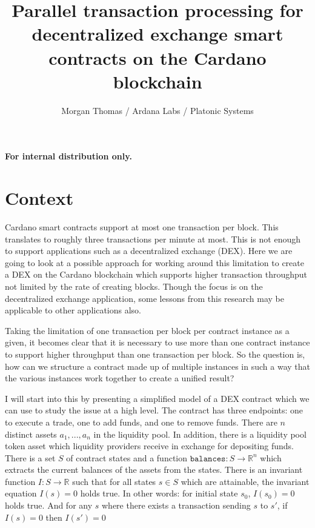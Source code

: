 \documentclass[12pt]{article}
\title{Parallel transaction processing for decentralized exchange smart contracts on the Cardano blockchain}
\author{Morgan Thomas / Ardana Labs / Platonic Systems}
\begin{document}
\maketitle

\begin{center}
	\textbf{For internal distribution only.}
\end{center}

\section{Context}

Cardano smart contracts support at most one transaction per block. This translates to roughly three transactions per minute at most.
This is not enough to support applications such as a decentralized exchange (DEX). Here we are going to look at a possible approach 
for working around this limitation to create a DEX on the Cardano blockchain which supports higher transaction
throughput not limited by the rate of creating blocks. Though the focus is on the decentralized exchange application, some lessons
from this research may be applicable to other applications also.

Taking the limitation of one transaction per block per contract instance as a given, it becomes clear that it is necessary to use more
than one contract instance to support higher throughput than one transaction per block. So the question is, how can we structure a
contract made up of multiple instances in such a way that the various instances work together to create a unified result?

I will start into this by presenting a simplified model of a DEX contract which we can use to study the issue at a high level.
The contract has three endpoints: one to execute a trade, one to add funds, and one to remove funds. There are $n$ distinct
assets $a_1,...,a_n$ in the liquidity pool. In addition, there is a liquidity pool token asset which liquidity
providers receive in exchange for depositing funds. There is a set $S$ of contract states and a function $\texttt{balances} : S \to \mathbb{R}^n$
which extracts the current balances of the assets from the states. There is an invariant function $I : S \to \mathbb{R}$
such that for all states $s \in S$ which are attainable, the invariant equation $I(s) = 0$ holds true.
In other words: for initial state $s_0$, $I(s_0) = 0$ holds true. And for any $s$ where there exists a transaction sending $s$ to $s'$, if $I(s) = 0$ then $I(s') = 0$
\end{document}
